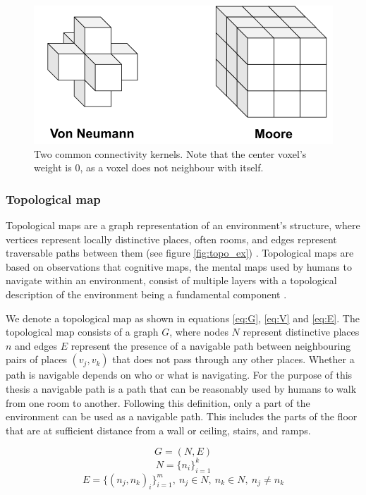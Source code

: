 \begin{figure}[h]
    \centering
    \includegraphics*[width=.7\textwidth]{./fig/voxel_neighbourhood.pdf}
    \caption{Two common connectivity kernels. Note that the center voxel's weight is 0, as a voxel does not neighbour with itself.}
    \label{fig:vg_nbs}
\end{figure}

\newpage


\subsubsection{Topological map}
Topological maps are a graph representation of an environment's structure, where vertices represent locally distinctive places, often rooms, and edges represent traversable paths between them  (see figure \ref{fig:topo_ex}) \citep{thrun_learning_1998,kuipers_robust_1988}. Topological maps are based on observations that cognitive maps, the mental maps used by humans to navigate within an environment, consist of multiple layers with a topological description of the environment being a fundamental component \citep{kuipers_robust_1988,kuipers_modeling_1978}. 

We denote a topological map as shown in equations \ref{eq:G}, \ref{eq:V} and \ref{eq:E}. The topological map consists of a graph \(G\), where nodes \(N\) represent distinctive places \(n\) and edges \(E\) represent the presence of a navigable path between neighbouring pairs of places \((v_j,v_k)\) that does not pass through any other places. Whether a path is navigable depends on who or what is navigating. For the purpose of this thesis a navigable path is a path that can be reasonably used by humans to walk from one room to another. Following this definition, only a part of the environment can be used as a navigable path. This includes the parts of the floor that are at sufficient distance from a wall or ceiling, stairs, and ramps.


\begin{equation}
    \label{eq:G}
    G=(N, E)
\end{equation}
\begin{equation}
    \label{eq:V}
    N=\{n_i\}_{i=1}^k
\end{equation}
\begin{equation}
    \label{eq:E}
    E=\{(n_j,n_k)_i\}_{i=1}^m,\ n_j \in N,\ n_k \in N,\ n_j \neq n_k
\end{equation}

